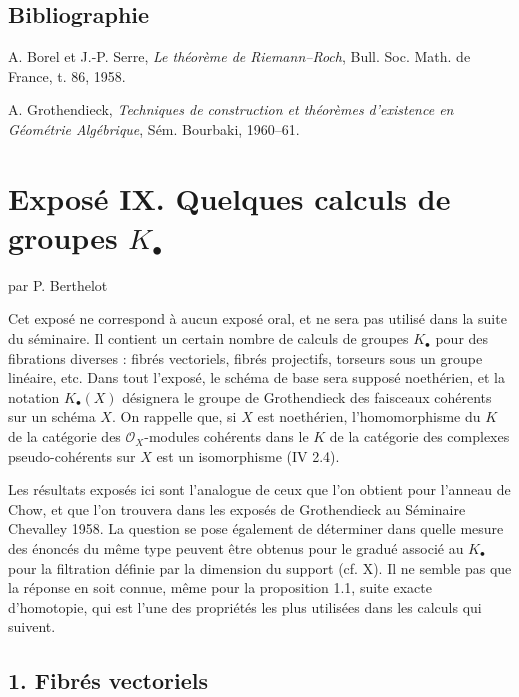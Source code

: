 \documentclass[11pt]{article}
\begin{document}
\subsection*{Bibliographie}
\begin{enumerate}[label={[\arabic*]}]
\item A. Borel et J.-P. Serre, \emph{Le théorème de Riemann--Roch}, Bull. Soc. Math. de France, t. 86, 1958.
\item A. Grothendieck, \emph{Techniques de construction et théorèmes d'existence en Géométrie Algébrique}, Sém. Bourbaki, 1960--61.
\end{enumerate}




\section*{Exposé IX. Quelques calculs de groupes $K_\bullet$}
\begin{center}
par P. Berthelot
\end{center}

Cet exposé ne correspond à aucun exposé oral, et ne sera pas utilisé dans la suite du séminaire. Il contient un certain nombre de calculs de groupes $K_\bullet$ pour des fibrations diverses : fibrés vectoriels, fibrés projectifs, torseurs sous un groupe linéaire, etc. Dans tout l'exposé, le schéma de base sera supposé noethérien, et la notation $K_\bullet(X)$ désignera le groupe de Grothendieck des faisceaux cohérents sur un schéma $X$. On rappelle que, si $X$ est noethérien, l'homomorphisme du $K$ de la catégorie des $\mathcal O_X$-modules cohérents dans le $K$ de la catégorie des complexes pseudo-cohérents sur $X$ est un isomorphisme (IV 2.4).

Les résultats exposés ici sont l'analogue de ceux que l'on obtient pour l'anneau de Chow, et que l'on trouvera dans les exposés de Grothendieck au Séminaire Chevalley 1958. La question se pose également de déterminer dans quelle mesure des énoncés du même type peuvent être obtenus pour le gradué associé au $K_\bullet$ pour la filtration définie par la dimension du support (cf. X). Il ne semble pas que la réponse en soit connue, même pour la proposition 1.1, suite exacte d'homotopie, qui est l'une des propriétés les plus utilisées dans les calculs qui suivent.

\subsection*{1. Fibrés vectoriels}
\end{document}
